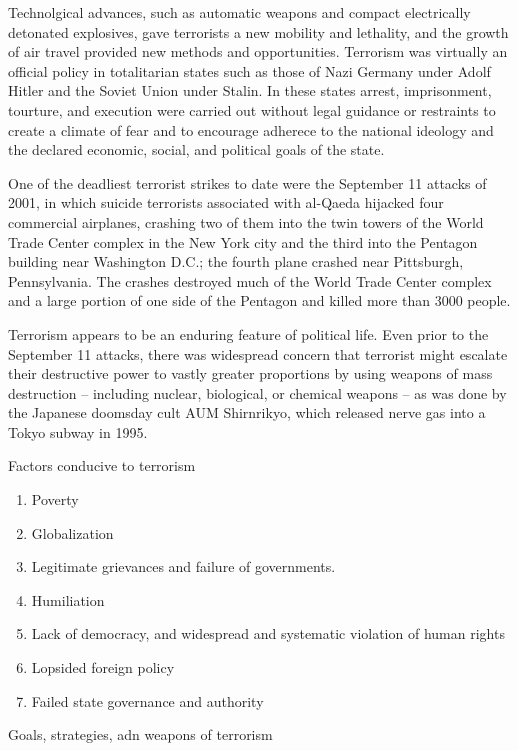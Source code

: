 \documentclass[
  openany]{book}
\providecommand{\tightlist}{%
  \setlength{\itemsep}{0pt}\setlength{\parskip}{0pt}}
\begin{document}
Technolgical advances, such as automatic weapons and compact electrically detonated explosives, gave terrorists a new mobility and lethality, and the growth of air travel provided new methods and opportunities. Terrorism was virtually an official policy in totalitarian states such as those of Nazi Germany under Adolf Hitler and the Soviet Union under Stalin. In these states arrest, imprisonment, tourture, and execution were carried out without legal guidance or restraints to create a climate of fear and to encourage adherece to the national ideology and the declared economic, social, and political goals of the state.

One of the deadliest terrorist strikes to date were the September 11 attacks of 2001, in which suicide terrorists associated with al-Qaeda hijacked four commercial airplanes, crashing two of them into the twin towers of the World Trade Center complex in the New York city and the third into the Pentagon building near Washington D.C.; the fourth plane crashed near Pittsburgh, Pennsylvania. The crashes destroyed much of the World Trade Center complex and a large portion of one side of the Pentagon and killed more than 3000 people.

Terrorism appears to be an enduring feature of political life. Even prior to the September 11 attacks, there was widespread concern that terrorist might escalate their destructive power to vastly greater proportions by using weapons of mass destruction -- including nuclear, biological, or chemical weapons -- as was done by the Japanese doomsday cult AUM Shirnrikyo, which released nerve gas into a Tokyo subway in 1995.

Factors conducive to terrorism

\begin{enumerate}
\def\labelenumi{\arabic{enumi}.}
\tightlist
\item
  Poverty
\item
  Globalization
\item
  Legitimate grievances and failure of governments.
\item
  Humiliation
\item
  Lack of democracy, and widespread and systematic violation of human rights
\item
  Lopsided foreign policy
\item
  Failed state governance and authority
\end{enumerate}

Goals, strategies, adn weapons of terrorism
\end{document}
